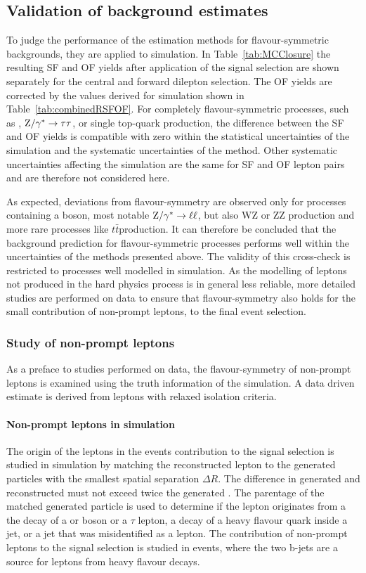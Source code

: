 \subsection{Validation of background estimates}
\label{sec:validation}
To judge the performance of the estimation methods for flavour-symmetric backgrounds, they are applied to simulation. In Table~\ref{tab:MCClosure} the resulting SF and OF yields after application of the signal selection are shown separately for the central and forward dilepton selection. The OF yields are corrected by the \Rsfof values derived for simulation shown in Table~\ref{tab:combinedRSFOF}. For completely flavour-symmetric processes, such as \ttbar, $\mathrm{Z}/\gamma^{*}\rightarrow \tau\tau$, or single top-quark production, the difference between the SF and OF yields is compatible with zero within the statistical uncertainties of the simulation and the systematic uncertainties of the method. Other systematic uncertainties affecting the simulation are the same for SF and OF lepton pairs and are therefore not considered here. 

 As expected, deviations from flavour-symmetry are observed only for processes containing a \Z boson, most notable $\mathrm{Z}/\gamma^{*}\rightarrow \ell\ell$, but also $\mathrm{WZ}$ or $\mathrm{ZZ}$ production and more rare processes like $t\bar{t}$\Z production. It can therefore be concluded that the background prediction for flavour-symmetric processes performs well within the uncertainties of the methods presented above. The validity of this cross-check is restricted to processes well modelled in simulation. As the modelling of leptons not produced in the hard physics process is in general less reliable, more detailed studies are performed on data to ensure that flavour-symmetry also holds for the small contribution of non-prompt leptons, to the final event selection.
\subsubsection*{Study of non-prompt leptons}
As a preface to studies performed on data, the flavour-symmetry of non-prompt leptons is examined using the truth information of the simulation. A data driven estimate is derived from leptons with relaxed isolation criteria.
\paragraph*{Non-prompt leptons in simulation}
The origin of the leptons in the events contribution to the signal selection is studied in simulation by matching the reconstructed lepton to the generated particles with the smallest spatial separation $\Delta R$. The difference in generated and reconstructed \pt must not exceed twice the generated \pt. The parentage of the matched generated particle is used to determine if the lepton originates from a the decay of a \Z or \W boson or a $\tau$ lepton, a decay of a heavy flavour quark inside a jet, or a jet that was misidentified as a lepton. The contribution of non-prompt leptons to the signal selection is studied in \ttbar events, where the two b-jets are a source for leptons from heavy flavour decays. 

